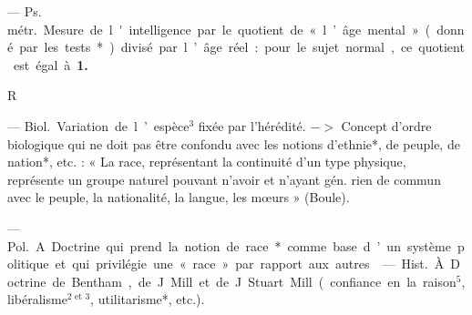 \begin{itemize}[leftmargin=1cm, label=, itemsep=1pt]
 — \si{Ps. métr.}
Mesure de l'intelligence par le quotient de « l’âge mental » (donné par
les tests*) divisé par l’âge réel : pour
le sujet normal, ce quotient est
égal à {\bf 1.}

\begin{center}
R
\end{center}

 — \si{Biol.} Variation de l’espèce$^3$
fixée par l’hérédité. $->$ Concept
d'ordre biologique qui ne doit pas
être confondu avec les notions
d’ethnie*, de peuple, de nation*, etc. :
« La race, représentant la continuité
d'un type physique, représente un
groupe naturel pouvant n’avoir et
n'ayant gén. rien de commun avec
le peuple, la nationalité, la langue,
les mœurs » (Boule).

 — \si{Pol.} A. Doctrine qui
prend la notion de race* comme base
d’un système politique et qui privilégie une « race » par rapport aux
autres.

 — \si{Hist.}
À. Doctrine de Bentham, de J. Mill
et de J. Stuart Mill (confiance en
la raison$^5$, libéralisme$^\text{2 et 3}$, utilitarisme*, etc.).


\end{itemize}
